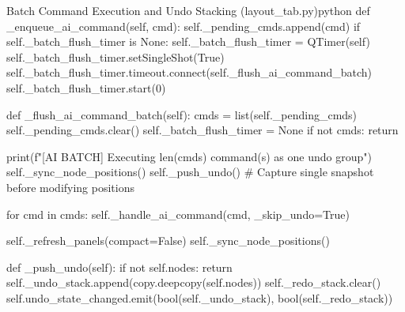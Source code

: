 \begin{thesiscode}{Batch Command Execution and Undo Stacking (layout\_tab.py)\label{lst:undo_batch}}{python}
def _enqueue_ai_command(self, cmd):
    self._pending_cmds.append(cmd)
    if self._batch_flush_timer is None:
        self._batch_flush_timer = QTimer(self)
        self._batch_flush_timer.setSingleShot(True)
        self._batch_flush_timer.timeout.connect(self._flush_ai_command_batch)
    self._batch_flush_timer.start(0)

def _flush_ai_command_batch(self):
    cmds = list(self._pending_cmds)
    self._pending_cmds.clear()
    self._batch_flush_timer = None
    if not cmds:
        return
        
    print(f"[AI BATCH] Executing {len(cmds)} command(s) as one undo group")
    self._sync_node_positions()
    self._push_undo()  # Capture single snapshot before modifying positions
    
    for cmd in cmds:
        self._handle_ai_command(cmd, _skip_undo=True)
        
    self._refresh_panels(compact=False)
    self._sync_node_positions()

def _push_undo(self):
    if not self.nodes:
        return
    self._undo_stack.append(copy.deepcopy(self.nodes))
    self._redo_stack.clear()
    self.undo_state_changed.emit(bool(self._undo_stack), bool(self._redo_stack))
\end{thesiscode}

